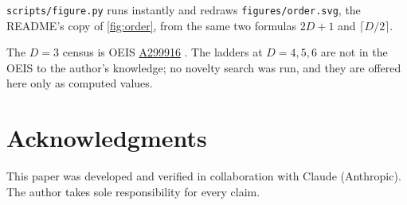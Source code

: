 \documentclass[11pt]{amsart}
\theoremstyle{definition}
\theoremstyle{remark}
\begin{document}
\texttt{scripts/figure.py} runs instantly and redraws \texttt{figures/order.svg}, the README's copy of \cref{fig:order}, from the same two formulas $2D+1$ and $\lceil D/2 \rceil$.

The $D = 3$ census is OEIS \href{https://oeis.org/A299916}{A299916} \cite{oeis}. The ladders at $D = 4, 5, 6$ are not in the OEIS to the author's knowledge; no novelty search was run, and they are offered here only as computed values.

\section*{Acknowledgments}

This paper was developed and verified in collaboration with Claude (Anthropic). The author takes sole responsibility for every claim.
\end{document}

